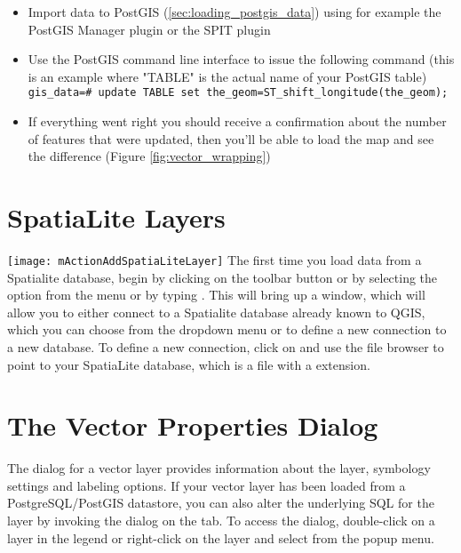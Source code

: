 
\begin{itemize}[label=--]
\item Import data to PostGIS (\ref{sec:loading_postgis_data}) using for
example the PostGIS Manager plugin or the SPIT plugin
\item Use the PostGIS command line interface to issue the following command
(this is an example where "TABLE" is the actual name of your PostGIS table) \\ 
\texttt{gis\_data=\# update TABLE set the\_geom=ST\_shift\_longitude(the\_geom);} 
\item If everything went right you should receive a confirmation about the
number of features that were updated, then you'll be able to load the map and
see the difference (Figure \ref{fig:vector_wrapping})
\end{itemize}

\section{SpatiaLite Layers} 
\label{label_spatialite} 

\texttt{[image: mActionAddSpatiaLiteLayer]}
The first time you load data from a Spatialite database, begin by clicking on the 
 toolbar button or by selecting the 
option from the  menu or by typing . 
This will bring up a window, which will allow you to either connect to a Spatialite database already known to QGIS, which 
you can choose from the dropdown menu or to define a new connection to a new database. To define a new connection, 
click on  and use the file browser to point to your SpatiaLite database, 
which is a file with a  extension.

\section{The Vector Properties Dialog}\label{sec:vectorprops}

The  dialog for a vector layer provides information
about the layer, symbology settings and labeling options. If your vector
layer has been loaded from a PostgreSQL/PostGIS datastore, you can also alter
the underlying SQL for the layer by invoking the 
dialog on the  tab. 
To access the  dialog, double-click on a layer in
the legend or right-click on the layer and select 
from the popup menu.

